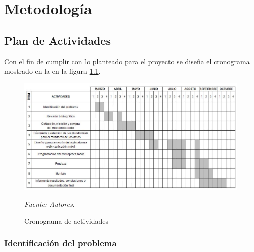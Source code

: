 
\chapter{Metodología}
\section{Plan de Actividades}

Con el fin de cumplir con lo planteado para el proyecto se diseña el cronograma mostrado en la en la figura \ref{fig:crono}.

\begin{figure}[ht!]
\begin{centering}
\includegraphics [trim = 0mm 0mm 0mm 0mm, clip,angle=0,scale=0.65]{Images/crono}%
\caption{\label{fig:crono}Cronograma de actividades}
\textit{Fuente: Autores}. 
\par\end{centering}
\end{figure}



\subsection{Identificación del problema}

